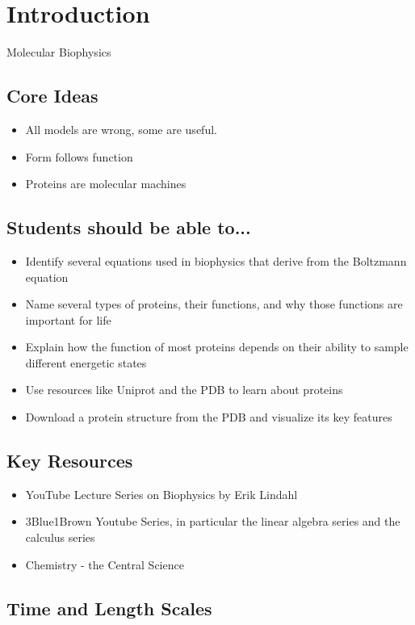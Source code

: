 \chapter{Introduction}

Molecular Biophysics

\section{Core Ideas}
\begin{itemize}
    \item All models are wrong, some are useful.
    \item Form follows function
    \item Proteins are molecular machines
\end{itemize}

\section{Students should be able to...}
\begin{itemize}
    \item Identify several equations used in biophysics that derive from the Boltzmann equation
    \item Name several types of proteins, their functions, and why those functions are important for life
    \item Explain how the function of most proteins depends on their ability to sample different energetic states
    \item Use resources like Uniprot and the PDB to learn about proteins
    \item Download a protein structure from the PDB and visualize its key features

\end{itemize}

\section{Key Resources}

\begin{itemize}
    \item YouTube Lecture Series on Biophysics by Erik Lindahl \cite{lindahl_lecture_series}
    \item 3Blue1Brown Youtube Series, in particular the linear algebra series\cite{3b1b_linalg} and the calculus series\cite{3b1b_calc}
    \item Chemistry - the Central Science \cite{ccs_libretext}
\end{itemize}

\printbibliography[heading=none]

\section{Time and Length Scales}

